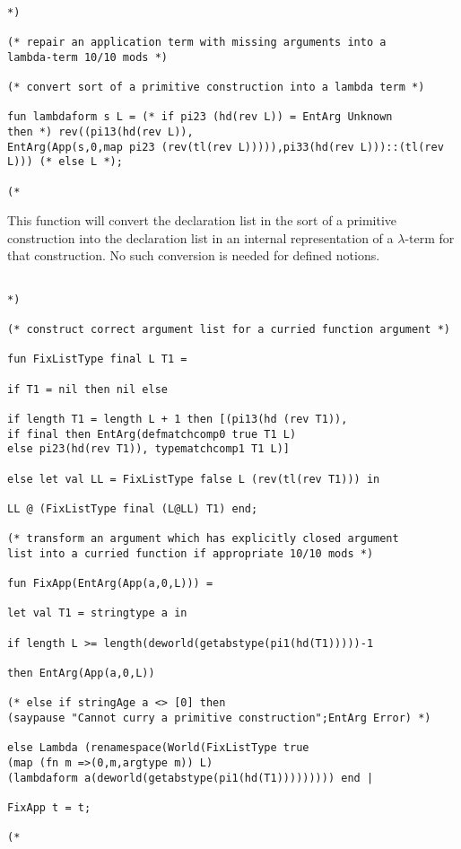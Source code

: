 \documentclass{article}
\begin{document}
\begin{verbatim}

*)

(* repair an application term with missing arguments into a 
lambda-term 10/10 mods *)

(* convert sort of a primitive construction into a lambda term *)

fun lambdaform s L = (* if pi23 (hd(rev L)) = EntArg Unknown
then *) rev((pi13(hd(rev L)),
EntArg(App(s,0,map pi23 (rev(tl(rev L))))),pi33(hd(rev L)))::(tl(rev L))) (* else L *);

(*

\end{verbatim}

This function will convert the declaration list in the sort of a primitive construction into the declaration list in an  internal representation of a $\lambda$-term for that construction.  No such conversion is needed for defined notions.

\begin{verbatim}

*)

(* construct correct argument list for a curried function argument *)

fun FixListType final L T1 =

if T1 = nil then nil else

if length T1 = length L + 1 then [(pi13(hd (rev T1)), 
if final then EntArg(defmatchcomp0 true T1 L) 
else pi23(hd(rev T1)), typematchcomp1 T1 L)]

else let val LL = FixListType false L (rev(tl(rev T1))) in

LL @ (FixListType final (L@LL) T1) end;

(* transform an argument which has explicitly closed argument
list into a curried function if appropriate 10/10 mods *)

fun FixApp(EntArg(App(a,0,L))) =

let val T1 = stringtype a in

if length L >= length(deworld(getabstype(pi1(hd(T1)))))-1

then EntArg(App(a,0,L))

(* else if stringAge a <> [0] then 
(saypause "Cannot curry a primitive construction";EntArg Error) *)

else Lambda (renamespace(World(FixListType true 
(map (fn m =>(0,m,argtype m)) L) 
(lambdaform a(deworld(getabstype(pi1(hd(T1))))))))) end |

FixApp t = t;

(*

\end{verbatim}
\end{document}
